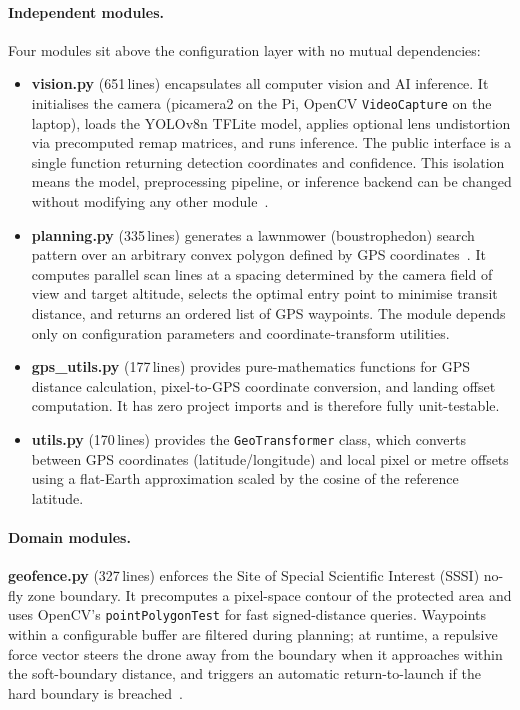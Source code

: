 \paragraph{Independent modules.}
Four modules sit above the configuration layer with no mutual dependencies:

\begin{itemize}
    \item \textbf{vision.py} (651\,lines) encapsulates all computer vision and AI inference. It initialises the camera (picamera2 on the Pi, OpenCV \texttt{VideoCapture} on the laptop), loads the YOLOv8n TFLite model, applies optional lens undistortion via precomputed remap matrices, and runs inference. The public interface is a single function returning detection coordinates and confidence. This isolation means the model, preprocessing pipeline, or inference backend can be changed without modifying any other module~\cite{yolov8}.

    \item \textbf{planning.py} (335\,lines) generates a lawnmower (boustrophedon) search pattern over an arbitrary convex polygon defined by GPS coordinates~\cite{boustrophedon}. It computes parallel scan lines at a spacing determined by the camera field of view and target altitude, selects the optimal entry point to minimise transit distance, and returns an ordered list of GPS waypoints. The module depends only on configuration parameters and coordinate-transform utilities.

    \item \textbf{gps\_utils.py} (177\,lines) provides pure-mathematics functions for GPS distance calculation, pixel-to-GPS coordinate conversion, and landing offset computation. It has zero project imports and is therefore fully unit-testable.

    \item \textbf{utils.py} (170\,lines) provides the \texttt{GeoTransformer} class, which converts between GPS coordinates (latitude/longitude) and local pixel or metre offsets using a flat-Earth approximation scaled by the cosine of the reference latitude.
\end{itemize}

\paragraph{Domain modules.}
\textbf{geofence.py} (327\,lines) enforces the Site of Special Scientific Interest (SSSI) no-fly zone boundary. It precomputes a pixel-space contour of the protected area and uses OpenCV's \texttt{pointPolygonTest} for fast signed-distance queries. Waypoints within a configurable buffer are filtered during planning; at runtime, a repulsive force vector steers the drone away from the boundary when it approaches within the soft-boundary distance, and triggers an automatic return-to-launch if the hard boundary is breached~\cite{wca1981}.


